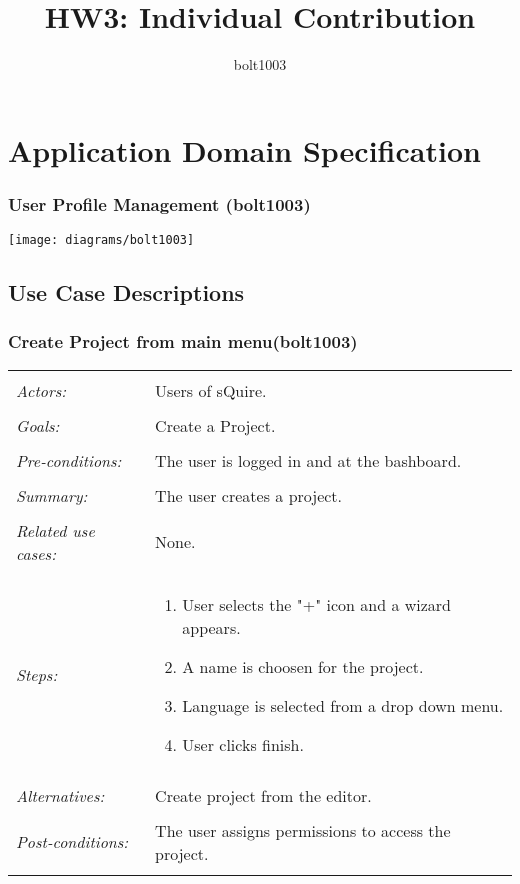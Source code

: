 \documentclass[11pt]{report}
\title{HW3: Individual Contribution}
\author{bolt1003}
\begin{document}
\maketitle

\chapter{Application Domain Specification}

\subsection{User Profile Management (bolt1003)}
\texttt{[image: diagrams/bolt1003]}

\section{Use Case Descriptions}

\subsection{Create Project from main menu(bolt1003)}
\begin{tabular}{ p{2cm} p{12cm} }
 \hline
 \\
 \textit{Actors:} & Users of sQuire. \\ 
 \\
 \textit{Goals:} & Create a Project. \\
 \\
 \textit{Pre-conditions:} & The user is logged in and at the bashboard. \\
 \\
 \textit{Summary:} & The user creates a project. \\ 
 \\
 \textit{Related use cases:} & None. \\ 
 \\
 \textit{Steps:} & \begin{enumerate}
  \item User selects the "+" icon and a wizard appears.
  \item A name is choosen for the project.
  \item Language is selected from a drop down menu.
  \item User clicks finish.
 \end{enumerate} \\
 \\
 \textit{Alternatives:} & Create project from the editor. \\
 \\
 \textit{Post-conditions:} & The user assigns permissions to access the project. \\
 \\
\hline
\end{tabular}
\end{document}
